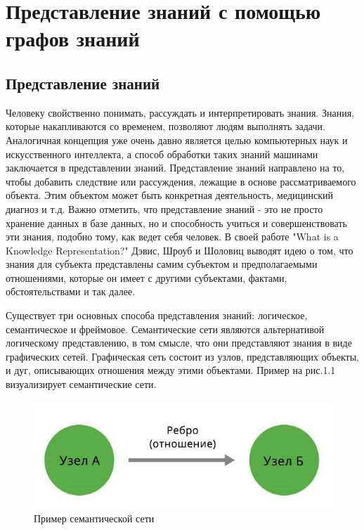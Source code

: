 \chapter{Представление знаний с помощью графов знаний} \label{ch1}



\section{Представление знаний}

Человеку свойственно понимать, рассуждать и интерпретировать знания. Знания, которые накапливаются со временем, позволяют людям выполнять
задачи. Аналогичная концепция уже очень давно является целью компьютерных наук и искусственного интеллекта, а способ обработки таких знаний
машинами заключается в представлении знаний. Представление знаний направлено на то, чтобы добавить следствие или рассуждения, лежащие в
основе рассматриваемого объекта. Этим объектом может быть конкретная деятельность, медицинский диагноз и т.д. Важно отметить, что
представление знаний - это не просто хранение данных в базе данных, но и способность учиться и совершенствовать эти знания, подобно тому, как
ведет себя человек. В своей работе "What is a Knowledge Representation?" Дэвис, Шроуб и Шоловиц выводят идею о том, что знания для субъекта
представлены самим субъектом и предполагаемыми отношениями, которые он имеет с другими субъектами, фактами, обстоятельствами и так далее.

Существует три основных способа представления знаний: логическое, семантическое и фреймовое. Семантические сети являются альтернативой
логическому представлению, в том смысле, что они представляют знания в виде графических сетей. Графическая сеть состоит из узлов,
представляющих объекты, и дуг, описывающих отношения между этими объектами. Пример на рис.1.1 визуализирует семантические сети.

\begin{figure}[ht!]
    \center
    \includegraphics[scale=0.8]{my_folder/myimg//1}
    \caption{Пример семантической сети}
\end{figure}


